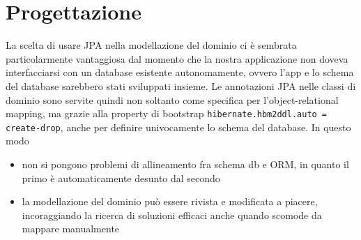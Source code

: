 \section{Progettazione}
La scelta di usare JPA nella modellazione del dominio ci è sembrata particolarmente vantaggiosa
dal momento che la nostra applicazione non doveva interfacciarsi con un database esistente autonomamente,
ovvero l'app e lo schema del database sarebbero stati sviluppati insieme. 
Le annotazioni JPA nelle classi di dominio
sono servite quindi non soltanto come specifica per l'object-relational mapping, ma grazie alla property
di bootstrap \texttt{hibernate.hbm2ddl.auto = create-drop}, anche per definire univocamente lo schema del database.
In questo modo 
\begin{itemize}
    \item non si pongono problemi di allineamento fra schema db e ORM, in quanto il primo
        è automaticamente desunto dal secondo
    \item la modellazione del dominio può essere rivista e modificata a piacere, incoraggiando
        la ricerca di soluzioni efficaci anche quando scomode da mappare manualmente
\end{itemize}


